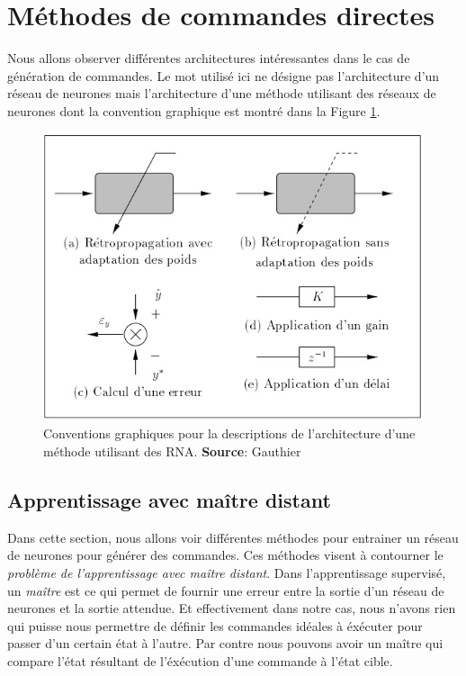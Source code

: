 \section{Méthodes de commandes directes}
Nous allons observer différentes architectures intéressantes dans le cas de génération de commandes.
Le mot  utilisé ici ne désigne pas l'architecture d'un réseau de neurones mais l'architecture d'une méthode utilisant des réseaux de neurones dont la convention graphique est montré dans la Figure \ref{legendearchi}.
\begin{figure}
 \centering
 \includegraphics[scale=0.6]{../figures/applegende.jpg}
 \caption{Conventions graphiques pour la descriptions de l'architecture d'une méthode utilisant des RNA. \textbf{Source}: Gauthier\cite{Gauthier}}
 \label{legendearchi}
\end{figure}

\subsection{Apprentissage avec maître distant}
Dans cette section, nous allons voir différentes méthodes pour entrainer un réseau de neurones pour générer des commandes.
Ces méthodes visent à contourner le \emph{problème de l'apprentissage avec maître distant}.
Dans l'apprentissage supervisé, un \emph{maître} est ce qui permet de fournir une erreur entre la sortie d'un réseau de neurones et la sortie attendue.
Et effectivement dans notre cas, nous n'avons rien qui puisse nous permettre de définir les commandes idéales à éxécuter pour passer d'un certain état à l'autre.
Par contre nous pouvons avoir un maître qui compare l'état résultant de l'éxécution d'une commande à l'état cible.

